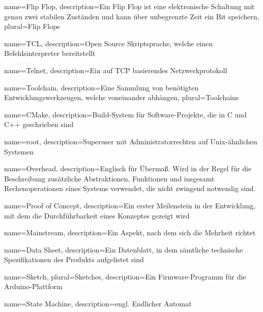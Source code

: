  {
    name={Flip Flop},
    description={Ein Flip Flop ist eine elektronische Schaltung mit genau zwei stabilen
                 Zuständen und kann über unbegrenzte Zeit ein Bit speichern},
    plural={Flip Flops}
}

 {
    name={TCL},
    description={Open Source Skriptsprache, welche einen Befehlsinterpreter bereitstellt}
}

 {
    name={Telnet},
    description={Ein auf TCP basierendes Netzwerkprotokoll}
}

 {
    name={Toolchain},
    description={Eine Sammlung von benötigten Entwicklungswerkzeugen, welche voneinander abhängen},
    plural={Toolchains}
}

 {
    name={CMake},
    description={Build-System für Software-Projekte, die in C und C++ geschrieben sind}
}

 {
    name={root},
    description={Superuser mit Administratorrechten auf Unix-ähnlichen Systemen}
}

 {
    name={Overhead},
    description={Englisch für Übermaß. Wird in der Regel für die Beschreibung zusätzliche Abstraktionen, Funktionen und
    insgesamt Rechenoperationen eines Systems verwendet, die nicht zwingend notwendig sind.}
}

 {
    name={Proof of Concept},
    description={Ein erster Meilenstein in der Entwicklung, mit dem die Durchführbarkeit eines Konzeptes gezeigt wird}
}

 {
    name={Mainstream},
    description={Ein Aspekt, nach dem sich die Mehrheit richtet}
}

 {
    name={Data Sheet},
    description={Ein Datenblatt, in dem sämtliche technische Spezifikationen des Produkts aufgelistet sind}
}

 {
    name={Sketch},
    plural={Sketches},
    description={Ein Firmware-Programm für die Arduino-Plattform}
}

 {
    name={State Machine},
    description={engl. Endlicher Automat}
}